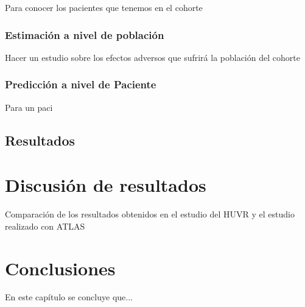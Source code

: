 Para conocer los pacientes que tenemos en el cohorte

\subsubsection{Estimación a nivel de población}

Hacer un estudio sobre los efectos adversos que sufrirá la población del cohorte

\subsubsection{Predicción a nivel de Paciente}

Para un paci

\subsection{Resultados}


\section{Discusión de resultados} \label{sec:08resultados}


Comparación de los resultados obtenidos en el estudio del HUVR y el estudio realizado con ATLAS


\section{Conclusiones} \label{sec:08conclusiones}

En este capítulo se concluye que...